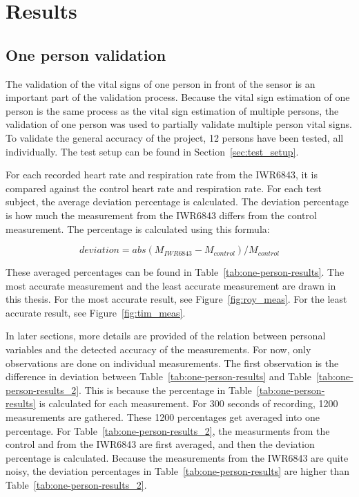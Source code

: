 \section{Results}
\subsection{One person validation}
\label{sec:one_pers_validation}
The validation of the vital signs of one person in front of the sensor is an important part of the validation process. Because the vital sign estimation of one person is the same process as the vital sign estimation of multiple persons, the validation of one person was used to partially validate multiple person vital signs. To validate the general accuracy of the project, 12 persons have been tested, all individually. The test setup can be found in Section~\ref{sec:test_setup}. 

For each recorded heart rate and respiration rate from the IWR6843, it is compared against the control heart rate and respiration rate. For each test subject, the average deviation percentage is calculated. The deviation percentage is how much the measurement from the IWR6843 differs from the control measurement. The percentage is calculated using this formula:

\begin{equation}
    deviation = abs(M_{IWR6843} - M_{control}) / M_{control}
    \label{eq:deviation_calculation}
\end{equation}

These averaged percentages can be found in Table~\ref{tab:one-person-results}. The most accurate measurement and the least accurate measurement are drawn in this thesis. For the most accurate result, see Figure~\ref{fig:roy_meas}. For the least accurate result, see Figure~\ref{fig:tim_meas}.

In later sections, more details are provided of the relation between personal variables and the detected accuracy of the measurements. For now, only observations are done on individual measurements. The first observation is the difference in deviation between Table~\ref{tab:one-person-results} and Table~\ref{tab:one-person-results_2}. This is because the percentage in Table~\ref{tab:one-person-results} is calculated for each measurement. For 300 seconds of recording, 1200 measurements are gathered. These 1200 percentages get averaged into one percentage. For Table~\ref{tab:one-person-results_2}, the measurments from the control and from the IWR6843 are first averaged, and then the deviation percentage is calculated. Because the measurements from the IWR6843 are quite noisy, the deviation percentages in Table~\ref{tab:one-person-results} are higher than Table~\ref{tab:one-person-results_2}.

